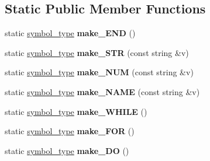 \subsection*{Static Public Member Functions}
\begin{DoxyCompactItemize}
\item 
\hypertarget{classyy_1_1parser_a81e92308791a1bb5818a69350c57eb64}{}static \hyperlink{classyy_1_1parser_aa8024edbba983aa5cd3e88c3a4dcacc9}{symbol\+\_\+type} {\bfseries make\+\_\+\+E\+N\+D} ()\label{classyy_1_1parser_a81e92308791a1bb5818a69350c57eb64}

\item 
\hypertarget{classyy_1_1parser_a23392111b67cade3a8c394f73e8cac53}{}static \hyperlink{classyy_1_1parser_aa8024edbba983aa5cd3e88c3a4dcacc9}{symbol\+\_\+type} {\bfseries make\+\_\+\+S\+T\+R} (const string \&v)\label{classyy_1_1parser_a23392111b67cade3a8c394f73e8cac53}

\item 
\hypertarget{classyy_1_1parser_af00b37698f20acf08ad9d0ebee9c35a6}{}static \hyperlink{classyy_1_1parser_aa8024edbba983aa5cd3e88c3a4dcacc9}{symbol\+\_\+type} {\bfseries make\+\_\+\+N\+U\+M} (const string \&v)\label{classyy_1_1parser_af00b37698f20acf08ad9d0ebee9c35a6}

\item 
\hypertarget{classyy_1_1parser_a1b851806e6814ff87c5262dfd0dd9591}{}static \hyperlink{classyy_1_1parser_aa8024edbba983aa5cd3e88c3a4dcacc9}{symbol\+\_\+type} {\bfseries make\+\_\+\+N\+A\+M\+E} (const string \&v)\label{classyy_1_1parser_a1b851806e6814ff87c5262dfd0dd9591}

\item 
\hypertarget{classyy_1_1parser_a78ff22741b47f2887515ef5884f603e7}{}static \hyperlink{classyy_1_1parser_aa8024edbba983aa5cd3e88c3a4dcacc9}{symbol\+\_\+type} {\bfseries make\+\_\+\+W\+H\+I\+L\+E} ()\label{classyy_1_1parser_a78ff22741b47f2887515ef5884f603e7}

\item 
\hypertarget{classyy_1_1parser_a60106ce43143c78bb6b481aaec637cd4}{}static \hyperlink{classyy_1_1parser_aa8024edbba983aa5cd3e88c3a4dcacc9}{symbol\+\_\+type} {\bfseries make\+\_\+\+F\+O\+R} ()\label{classyy_1_1parser_a60106ce43143c78bb6b481aaec637cd4}

\item 
\hypertarget{classyy_1_1parser_a8ba06137ebb615147a8ded7d26862b21}{}static \hyperlink{classyy_1_1parser_aa8024edbba983aa5cd3e88c3a4dcacc9}{symbol\+\_\+type} {\bfseries make\+\_\+\+D\+O} ()\label{classyy_1_1parser_a8ba06137ebb615147a8ded7d26862b21}


\end{DoxyCompactItemize}
